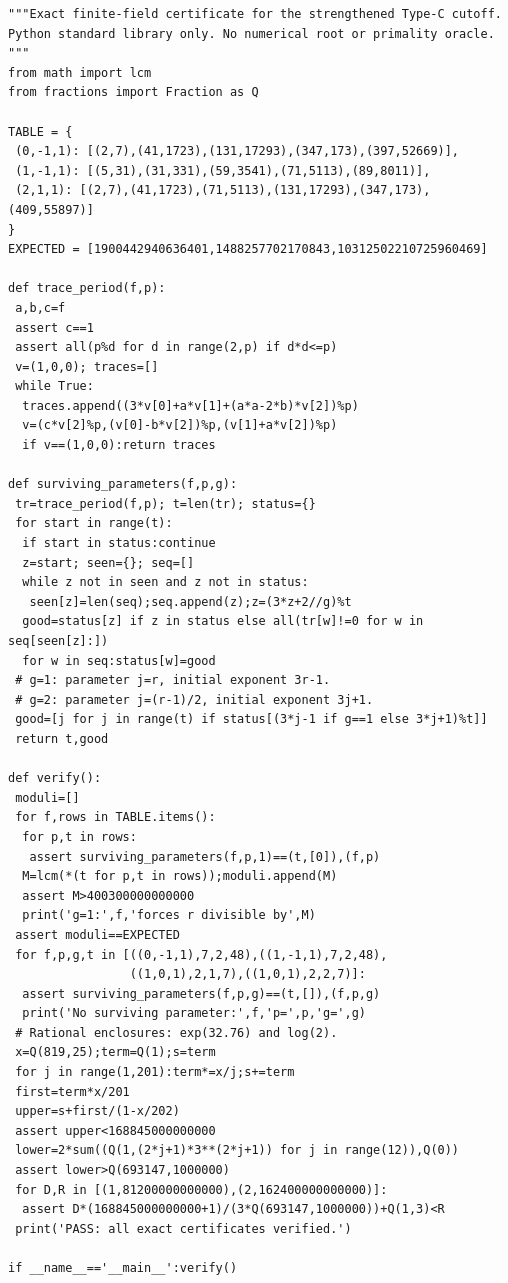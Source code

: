 \documentclass[11pt,a4paper]{article}
\theoremstyle{definition}
\theoremstyle{remark}
\numberwithin{equation}{section}
\begin{document}
\begin{lstlisting}
"""Exact finite-field certificate for the strengthened Type-C cutoff.
Python standard library only. No numerical root or primality oracle.
"""
from math import lcm
from fractions import Fraction as Q

TABLE = {
 (0,-1,1): [(2,7),(41,1723),(131,17293),(347,173),(397,52669)],
 (1,-1,1): [(5,31),(31,331),(59,3541),(71,5113),(89,8011)],
 (2,1,1): [(2,7),(41,1723),(71,5113),(131,17293),(347,173),(409,55897)]
}
EXPECTED = [1900442940636401,1488257702170843,10312502210725960469]

def trace_period(f,p):
 a,b,c=f
 assert c==1
 assert all(p%d for d in range(2,p) if d*d<=p)
 v=(1,0,0); traces=[]
 while True:
  traces.append((3*v[0]+a*v[1]+(a*a-2*b)*v[2])%p)
  v=(c*v[2]%p,(v[0]-b*v[2])%p,(v[1]+a*v[2])%p)
  if v==(1,0,0):return traces

def surviving_parameters(f,p,g):
 tr=trace_period(f,p); t=len(tr); status={}
 for start in range(t):
  if start in status:continue
  z=start; seen={}; seq=[]
  while z not in seen and z not in status:
   seen[z]=len(seq);seq.append(z);z=(3*z+2//g)%t
  good=status[z] if z in status else all(tr[w]!=0 for w in seq[seen[z]:])
  for w in seq:status[w]=good
 # g=1: parameter j=r, initial exponent 3r-1.
 # g=2: parameter j=(r-1)/2, initial exponent 3j+1.
 good=[j for j in range(t) if status[(3*j-1 if g==1 else 3*j+1)%t]]
 return t,good

def verify():
 moduli=[]
 for f,rows in TABLE.items():
  for p,t in rows:
   assert surviving_parameters(f,p,1)==(t,[0]),(f,p)
  M=lcm(*(t for p,t in rows));moduli.append(M)
  assert M>400300000000000
  print('g=1:',f,'forces r divisible by',M)
 assert moduli==EXPECTED
 for f,p,g,t in [((0,-1,1),7,2,48),((1,-1,1),7,2,48),
                 ((1,0,1),2,1,7),((1,0,1),2,2,7)]:
  assert surviving_parameters(f,p,g)==(t,[]),(f,p,g)
  print('No surviving parameter:',f,'p=',p,'g=',g)
 # Rational enclosures: exp(32.76) and log(2).
 x=Q(819,25);term=Q(1);s=term
 for j in range(1,201):term*=x/j;s+=term
 first=term*x/201
 upper=s+first/(1-x/202)
 assert upper<168845000000000
 lower=2*sum((Q(1,(2*j+1)*3**(2*j+1)) for j in range(12)),Q(0))
 assert lower>Q(693147,1000000)
 for D,R in [(1,81200000000000),(2,162400000000000)]:
  assert D*(168845000000000+1)/(3*Q(693147,1000000))+Q(1,3)<R
 print('PASS: all exact certificates verified.')

if __name__=='__main__':verify()

\end{lstlisting}
\endgroup
\end{document}
